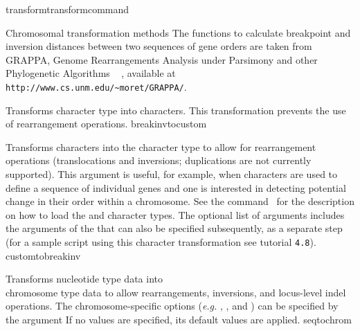 \begin{command}{transform}{transformcommand}
\begin{arguments}
\begin{argumentgroup}{Chromosomal transformation methods}
          The functions to calculate breakpoint and inversion distances between two
	sequences of gene orders are taken from GRAPPA, Genome
	Rearrangements Analysis under Parsimony and other Phylogenetic Algorithms ~     \cite{baderetal2002},
	available at \texttt{http://www.cs.unm.edu/\~{}moret/GRAPPA/}.
	
            {Transforms  character type into  characters.
            This transformation prevents the use of rearrangement operations.} 
            {breakinvtocustom}

            {Transforms  characters into the  character type to 
            allow for rearrangement operations (translocations and inversions; duplications are not currently supported).  
            This argument is useful, for example, when  characters are used to define a sequence of
            individual genes and one is interested in detecting potential change in their order within a chromosome. 
            See the command~ for the description on how to load the  and  character types. The optional list of arguments
            includes the arguments of the  that can also
            be specified subsequently, as a separate step (for a sample script using this character transformation see tutorial \texttt{4.8}).}
            {customtobreakinv}
             
           {Transforms nucleotide type data into \\ chromosome type data to allow
            rearrangements, inversions, and locus-level indel operations.  The
            chromosome-specific options (\emph{e.g.}  , 
            , and ) can be specified by the argument
             If no  values
           are specified, its default values are applied.}
           {seqtochrom}
           

\end{argumentgroup}
\end{arguments}
\end{command}
